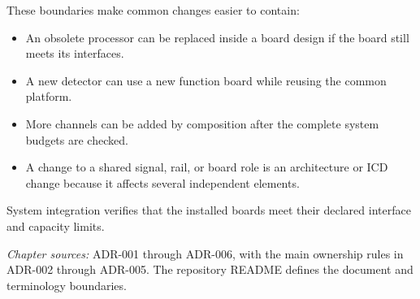 These boundaries make common changes easier to contain:

\begin{itemize}
  \item An obsolete processor can be replaced inside a board design if the board still meets its interfaces.
  \item A new detector can use a new function board while reusing the common platform.
  \item More channels can be added by composition after the complete system budgets are checked.
  \item A change to a shared signal, rail, or board role is an architecture or ICD change because it affects several independent elements.
\end{itemize}

System integration verifies that the installed boards meet their declared interface and capacity limits.

\medskip
\noindent\textit{Chapter sources:} ADR-001 through ADR-006, with the main ownership rules in ADR-002 through ADR-005. The repository README defines the document and terminology boundaries.
